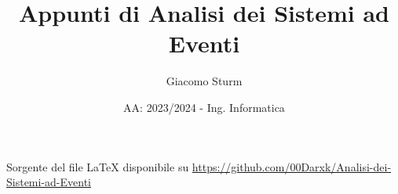 \documentclass{article}
\title{Appunti di Analisi dei Sistemi ad Eventi}
\author{Giacomo Sturm}
\date{AA: 2023/2024 - Ing. Informatica}
\numberwithin{equation}{subsection}
\begin{document}
\maketitle

\vspace{10mm}

\begin{center}
    Sorgente del file LaTeX disponibile su \url{https://github.com/00Darxk/Analisi-dei-Sistemi-ad-Eventi}
\end{center}

\clearpage

\tableofcontents

\clearpage
\end{document}
